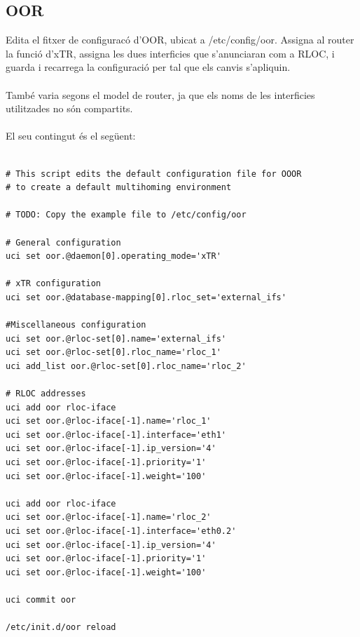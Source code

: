 \documentclass[11pt]{article}
\begin{document}
\subsection{OOR}
Edita el fitxer de configuracó d’OOR, ubicat a /etc/config/oor. Assigna al router la funció d’xTR, assigna les dues interficies que s’anunciaran com a RLOC, i guarda i recarrega la configuració per tal que els canvis s’apliquin.\\
\\
També varia segons el model de router, ja que els noms de les interficies utilitzades no són compartits.\\
\\
El seu contingut és el següent:\\
\begin{lstlisting}[frame=single]

# This script edits the default configuration file for OOOR
# to create a default multihoming environment

# TODO: Copy the example file to /etc/config/oor

# General configuration
uci set oor.@daemon[0].operating_mode='xTR'

# xTR configuration
uci set oor.@database-mapping[0].rloc_set='external_ifs'

#Miscellaneous configuration
uci set oor.@rloc-set[0].name='external_ifs'
uci set oor.@rloc-set[0].rloc_name='rloc_1'
uci add_list oor.@rloc-set[0].rloc_name='rloc_2'

# RLOC addresses
uci add oor rloc-iface
uci set oor.@rloc-iface[-1].name='rloc_1'
uci set oor.@rloc-iface[-1].interface='eth1'
uci set oor.@rloc-iface[-1].ip_version='4'
uci set oor.@rloc-iface[-1].priority='1'
uci set oor.@rloc-iface[-1].weight='100'

uci add oor rloc-iface
uci set oor.@rloc-iface[-1].name='rloc_2'
uci set oor.@rloc-iface[-1].interface='eth0.2'
uci set oor.@rloc-iface[-1].ip_version='4'
uci set oor.@rloc-iface[-1].priority='1'
uci set oor.@rloc-iface[-1].weight='100'

uci commit oor

/etc/init.d/oor reload
\end{lstlisting}
\end{document}
